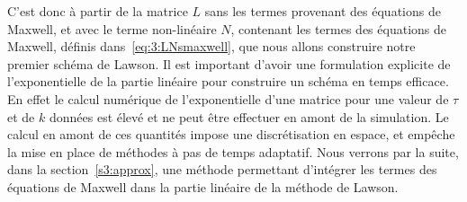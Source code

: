 

C'est donc à partir de la matrice $L$ sans les termes provenant des équations de Maxwell, et avec le terme non-linéaire $N$, contenant les termes des équations de Maxwell, définis dans~\eqref{eq:3:LNsmaxwell}, que nous allons construire notre premier schéma de Lawson. Il est important d'avoir une formulation explicite de l'exponentielle de la partie linéaire pour construire un schéma en temps efficace. En effet le calcul numérique de l'exponentielle d'une matrice pour une valeur de $\tau$ et de $k$ données est élevé et ne peut être effectuer en amont de la simulation. Le calcul en amont de ces quantités impose une discrétisation en espace, et empêche la mise en place de méthodes à pas de temps adaptatif. Nous verrons par la suite, dans la section~\ref{s3:approx}, une méthode permettant d'intégrer les termes des équations de Maxwell dans la partie linéaire de la méthode de Lawson.

